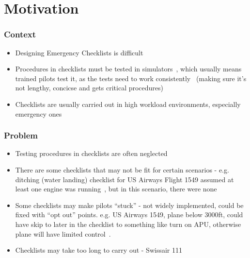 \documentclass[../dissertation.tex]{subfiles}
\begin{document}
\section{Motivation}
\subsubsection*{Context}
\begin{itemize}
    \item Designing Emergency Checklists is difficult
    \item Procedures in checklists must be tested in simulators~\cite{nasa-design},
      which usually means trained pilots test it, as the tests need
      to work consistently~\cite{manifesto} (making sure it's not lengthy,
      concicse and gets critical procedures)
    \item Checklists are usually carried out in high
        workload environments, especially emergency ones
\end{itemize}

\subsubsection*{Problem}
\begin{itemize}
  \item Testing procedures in checklists are often neglected~\cite{nasa-design}
    \item There are some checklists that may not be fit
        for certain scenarios - e.g. ditching (water landing)
        checklist for US Airways Flight 1549 assumed at least one engine
        was running~\cite{AWE1549}, but in this scenario, there were none
    \item Some checklists may make pilots \enquote{stuck}
      - not widely implemented, could be fixed with \enquote{opt out} points.
      e.g. US Airways 1549, plane below 3000ft, could have skip to
      later in the checklist to something like turn on APU, otherwise plane
      will have limited control~\cite{AWE1549}.
    \item Checklists may take too long to carry out - Swissair 111
\end{itemize}
\end{document}
